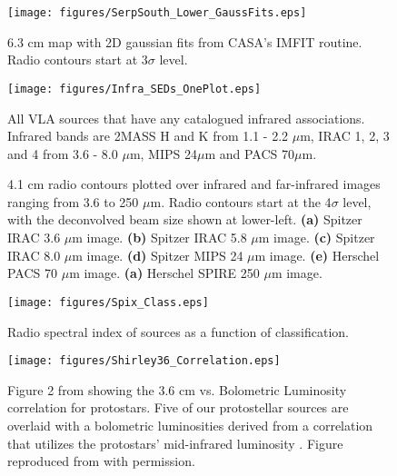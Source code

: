 \documentclass[apj]{emulateapj}
\begin{document}
\begin{figure}[h!]
\label{fig:serpsouth_lower_gaussfits}
\centering
\texttt{[image: figures/SerpSouth\_Lower\_GaussFits.eps]}
\caption{\small{6.3 cm map with 2D gaussian fits from CASA's IMFIT routine. Radio contours start at 3$\sigma$ level.
}}
\end{figure}

\begin{figure}
\label{fig:infra_SEDs}
\centering
\texttt{[image: figures/Infra\_SEDs\_OnePlot.eps]}
\caption{\small{All VLA sources that have any catalogued infrared associations. Infrared bands are 2MASS H and K from 1.1 - 2.2 $\mu$m, IRAC 1, 2, 3 and 4 from 3.6 - 8.0 $\mu$m, MIPS 24$\mu$m and PACS 70$\mu$m. 
}}
\end{figure}

\begin{figure}
\label{fig:infrared_associations}
\caption{\small{ 4.1 cm radio contours plotted over infrared and far-infrared images ranging from 3.6 to 250 $\mu$m. Radio contours start at the 4$\sigma$ level, with the deconvolved beam size shown at lower-left. {\bfseries (a)} Spitzer IRAC 3.6 $\mu$m image. {\bfseries (b)} Spitzer IRAC 5.8 $\mu$m image. {\bfseries (c)} Spitzer IRAC 8.0 $\mu$m image. {\bfseries (d)} Spitzer MIPS 24 $\mu$m image. {\bfseries (e)} Herschel PACS 70 $\mu$m image. {\bfseries (a)} Herschel SPIRE 250 $\mu$m image.
}}
\end{figure}

\begin{figure}
\label{fig:spix_class}
\centering
\texttt{[image: figures/Spix\_Class.eps]}
\caption{\small{Radio spectral index of sources as a function of classification.
}}
\end{figure}

\begin{figure}
\label{fig:shirley36_corr}
\centering
\texttt{[image: figures/Shirley36\_Correlation.eps]}
\caption{\small{Figure 2 from \citet{Shirley07} showing the 3.6 cm vs. Bolometric Luminosity correlation for protostars. Five of our protostellar sources are overlaid with a bolometric luminosities derived from a correlation that utilizes the protostars' mid-infrared luminosity \citep{Kryukova12}. Figure reproduced from \citet{Shirley07} with permission.
}}
\end{figure}
\end{document}
